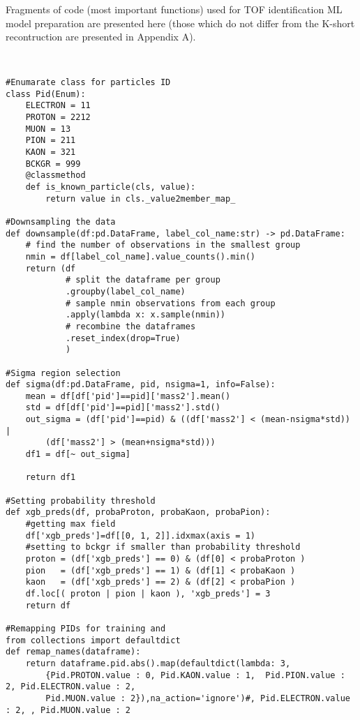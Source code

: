 \pagestyle{fancy}
\thispagestyle{fancy}

Fragments of code (most important functions) used for TOF identification ML model preparation are presented here (those which do not differ from the K-short recontruction are presented in Appendix A).

\lstset{language=Python}
\begin{lstlisting}


#Enumarate class for particles ID
class Pid(Enum):
    ELECTRON = 11
    PROTON = 2212 
    MUON = 13
    PION = 211
    KAON = 321
    BCKGR = 999
    @classmethod
    def is_known_particle(cls, value):
        return value in cls._value2member_map_ 
        
#Downsampling the data
def downsample(df:pd.DataFrame, label_col_name:str) -> pd.DataFrame:
    # find the number of observations in the smallest group
    nmin = df[label_col_name].value_counts().min()
    return (df
            # split the dataframe per group
            .groupby(label_col_name)
            # sample nmin observations from each group
            .apply(lambda x: x.sample(nmin))
            # recombine the dataframes
            .reset_index(drop=True)
            )
            
#Sigma region selection
def sigma(df:pd.DataFrame, pid, nsigma=1, info=False):
    mean = df[df['pid']==pid]['mass2'].mean()
    std = df[df['pid']==pid]['mass2'].std()
    out_sigma = (df['pid']==pid) & ((df['mass2'] < (mean-nsigma*std)) | 
        (df['mass2'] > (mean+nsigma*std)))
    df1 = df[~ out_sigma]

    return df1

#Setting probability threshold
def xgb_preds(df, probaProton, probaKaon, probaPion):
    #getting max field
    df['xgb_preds']=df[[0, 1, 2]].idxmax(axis = 1)
    #setting to bckgr if smaller than probability threshold
    proton = (df['xgb_preds'] == 0) & (df[0] < probaProton )
    pion   = (df['xgb_preds'] == 1) & (df[1] < probaKaon )
    kaon   = (df['xgb_preds'] == 2) & (df[2] < probaPion )
    df.loc[( proton | pion | kaon ), 'xgb_preds'] = 3
    return df

#Remapping PIDs for training and 
from collections import defaultdict
def remap_names(dataframe):
    return dataframe.pid.abs().map(defaultdict(lambda: 3, 
        {Pid.PROTON.value : 0, Pid.KAON.value : 1,  Pid.PION.value : 2, Pid.ELECTRON.value : 2,
        Pid.MUON.value : 2}),na_action='ignore')#, Pid.ELECTRON.value : 2, , Pid.MUON.value : 2
 

\end{lstlisting}
